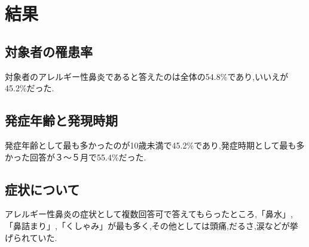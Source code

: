 \documentclass{jsarticle}
\begin{document}
\section{結果}
\subsection{対象者の罹患率}
対象者のアレルギー性鼻炎であると答えたのは全体の54.8\%であり,いいえが45.2\%だった.
\subsection{発症年齢と発現時期}
発症年齢として最も多かったのが10歳未満で45.2\%であり,発症時期として最も多かった回答が３〜５月で55.4\%だった.
\subsection{症状について}
アレルギー性鼻炎の症状として複数回答可で答えてもらったところ,「鼻水」,「鼻詰まり」,「くしゃみ」が最も多く,その他としては頭痛,だるさ,涙などが挙げられていた.
\end{document}
